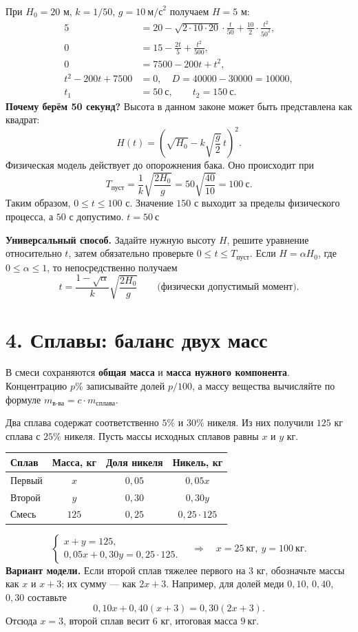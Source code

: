 \documentclass[a4paper,12pt]{article}
\newcommand{\important}[1]{\textcolor{deepaccent}{\textbf{#1}}}
\newcommand{\method}[1]{\medskip\noindent\textcolor{deepaccent}{\textbf{#1}}\quad}
\newcommand{\sectiontitle}[1]{\needspace{6\baselineskip}\section*{\color{deepaccent}#1}}
\begin{document}
При \(H_0=20\) м, \(k=1/50\), \(g=10\ \text{м/с}^2\) получаем \(H=5\) м:
\begin{align*}
5&=20-\sqrt{2\cdot10\cdot20}\cdot\frac{t}{50}
       +\frac{10}{2}\cdot\frac{t^2}{50^2},\\
0&=15-\frac{2t}{5}+\frac{t^2}{500},\\
0&=7500-200t+t^2,\\
t^2-200t+7500&=0,\quad D=40000-30000=10000,\\
t_1&=50\ \text{с},\qquad t_2=150\ \text{с}.
\end{align*}
\important{Почему берём 50 секунд?} Высота в данном законе может быть представлена как квадрат:
\[
H(t)=\left(\sqrt{H_0}-k\sqrt{\frac g2}\,t\right)^2.
\]
Физическая модель действует до опорожнения бака. Оно происходит при
\[
T_{\text{пуст}}=\frac{1}{k}\sqrt{\frac{2H_0}{g}}
=50\sqrt{\frac{40}{10}}=100\ \text{с}.
\]
Таким образом, \(0\le t\le100\) с. Значение \(150\) с выходит за пределы физического процесса, а \(50\) с допустимо. \(\boxed{t=50\ \text{с}}\)

\method{Универсальный способ.} Задайте нужную высоту \(H\), решите уравнение относительно \(t\), затем обязательно проверьте \(0\le t\le T_{\text{пуст}}\). Если \(H=\alpha H_0\), где \(0\le\alpha\le1\), то непосредственно получаем
\[
\boxed{\displaystyle t=\frac{1-\sqrt\alpha}{k}\sqrt{\frac{2H_0}{g}}}\qquad
\text{(физически допустимый момент)}.
\]

\sectiontitle{4. Сплавы: баланс двух масс}
В смеси сохраняются \important{общая масса} и \important{масса нужного компонента}. Концентрацию \(p\%\) записывайте долей \(p/100\), а массу вещества вычисляйте по формуле \(m_{\text{в-ва}}=c\cdot m_{\text{сплава}}\).

Два сплава содержат соответственно \(5\%\) и \(30\%\) никеля. Из них получили \(125\) кг сплава с \(25\%\) никеля. Пусть массы исходных сплавов равны \(x\) и \(y\) кг.
\begin{center}
\renewcommand{\arraystretch}{1.22}
\begin{tabularx}{\linewidth}{@{}Xccc@{}}
\toprule
Сплав & Масса, кг & Доля никеля & Никель, кг\\
\midrule
Первый & \(x\) & \(0{,}05\) & \(0{,}05x\)\\
Второй & \(y\) & \(0{,}30\) & \(0{,}30y\)\\
Смесь & \(125\) & \(0{,}25\) & \(0{,}25\cdot125\)\\
\bottomrule
\end{tabularx}
\end{center}
\[
\begin{cases}
x+y=125,\\
0{,}05x+0{,}30y=0{,}25\cdot125.
\end{cases}
\quad\Longrightarrow\quad
\boxed{x=25\ \text{кг},\ y=100\ \text{кг}}.
\]
\method{Вариант модели.} Если второй сплав тяжелее первого на \(3\) кг, обозначьте массы как \(x\) и \(x+3\); их сумму --- как \(2x+3\). Например, для долей меди \(0{,}10\), \(0{,}40\), \(0{,}30\) составьте
\[
0{,}10x+0{,}40(x+3)=0{,}30(2x+3).
\]
Отсюда \(x=3\), второй сплав весит \(6\) кг, итоговая масса \(\boxed{9\ \text{кг}}\).
\end{document}
